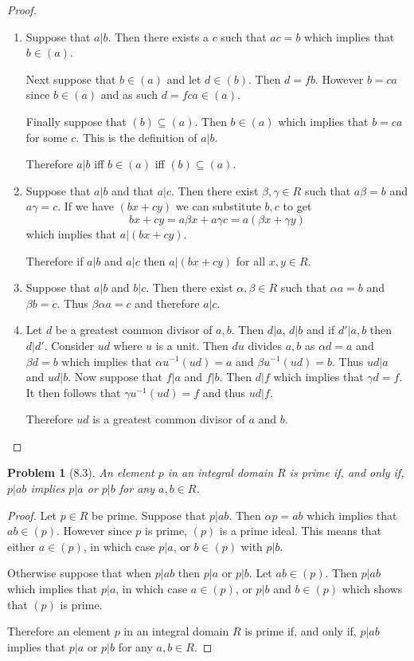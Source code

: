 \documentclass[10pt]{article}
\newcommand{\sk}{\vskip 10mm}
\theoremstyle{plain}
\newtheorem{problem}{Problem}
\theoremstyle{remark}
\begin{document}
\begin{proof}
  \begin{enumerate}
  \item Suppose that $a|b$. Then there exists a $c$ such that $ac=b$ which implies
    that $b\in (a)$.

    Next suppose that $b\in(a)$ and let $d\in (b)$. Then $d=fb$. However $b=ca$ since
    $b\in (a)$ and as such $d=fca\in (a)$.

    Finally suppose that $(b)\subseteq (a)$. Then $b\in(a)$ which implies that $b=ca$ for
    some $c$. This is the definition of $a|b$.

    Therefore $a|b$ iff $b\in(a)$ iff $(b)\subseteq(a)$.
    
  \item Suppose that $a|b$ and that $a|c$. Then there exist $\beta,\gamma\in R$ such that
    $a\beta = b$ and $a\gamma = c$. If we have $(bx+cy)$ we can substitute $b,c$ to get
    \[ bx+cy = a\beta x + a\gamma c = a(\beta x + \gamma y)\]
    which implies that $a|(bx+cy)$.

    Therefore if $a|b$ and $a|c$ then $a|(bx+cy)$ for all $x,y\in R$.

  \item Suppose that $a|b$ and $b|c$. Then there exist $\alpha,\beta\in R$ such that
    $\alpha a = b$ and $\beta b = c$. Thus $\beta\alpha a =c$ and therefore $a|c$.

  \item Let $d$ be a greatest common divisor of $a,b$. Then
    $d|a$, $d|b$ and if $d'|a,b$ then $d|d'$. Consider $ud$ where $u$ is a unit.
    Then $du$ divides $a,b$ as $\alpha d=a$ and $\beta d=b$ which implies that
    $\alpha u^{-1}(ud) =a $ and $\beta u^{-1}(ud) = b$. Thus $ud|a$ and $ud|b$.
    Now suppose that $f|a$ and $f|b$. Then $d|f$ which implies that
    $\gamma d = f$. It then follows that $\gamma u^{-1}(ud)=f$ and thus $ud|f$.

    Therefore $ud$ is a greatest common divisor of $a$ and $b$.
  \end{enumerate}
\end{proof}

\sk

\begin{problem}[8.3]
  An element $p$ in an integral domain $R$ is prime if, and only if,
  $p|ab$ implies $p|a$ or $p|b$ for any $a,b\in R$.
\end{problem}

\begin{proof}
  Let $p\in R$ be prime. Suppose that $p|ab$. Then $\alpha p=ab$ which implies
  that $ab\in (p)$. However since $p$ is prime, $(p)$ is a prime ideal.
  This means that either $a\in (p)$, in which case $p|a$, or $b\in (p)$ with $p|b$.

  Otherwise suppose that when $p|ab$ then $p|a$ or $p|b$. Let $ab\in (p)$. Then
  $p|ab$ which implies that $p|a$, in which case $a\in (p)$, or $p|b$ and $b\in (p)$
  which shows that $(p)$ is prime.

  Therefore an element $p$ in an integral domain $R$ is prime if, and only if,
  $p|ab$ implies that $p|a$ or $p|b$ for any $a,b\in R$.
\end{proof}
\end{document}
